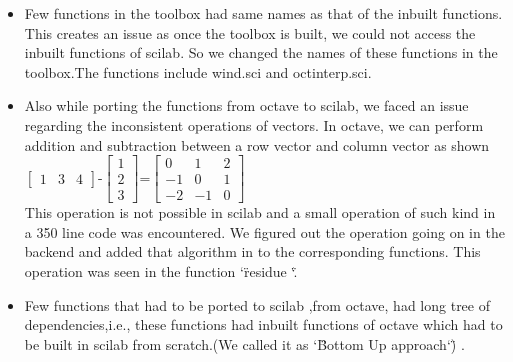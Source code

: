 \documentclass[12pt,a4paper]{report}
\begin{document}
\begin{itemize}
\item Few functions in the toolbox had same names as that of the inbuilt functions. This creates an issue as once the toolbox is built, we could not access the inbuilt functions of scilab. So we changed the names of these functions in the toolbox.The functions include wind.sci and oct\textunderscore interp.sci.


\newpage

\item Also while porting the functions from octave to scilab, we faced an issue regarding the inconsistent operations of vectors. In octave, we can perform addition and subtraction between a row vector and column vector as shown\\


$\begin{bmatrix}
 1&3&4
\end{bmatrix}$-$\begin{bmatrix}
1\\
2\\
3
\end{bmatrix}$=$\begin{bmatrix}
0 & 1 &2 \\
-1 &0  &1 \\
 -2& -1 &0
\end{bmatrix}$ \\

This operation is not possible in scilab and a small operation of such kind in a 350 line code was encountered. We figured out the operation going on in the backend and added that algorithm in to the  corresponding functions. This operation was seen in the function \char`\"residue \char`\".

\item Few functions that had to be ported to scilab ,from octave, had long tree of dependencies,i.e., these functions had inbuilt functions of octave which had to be built in scilab from scratch.(We called it as \char`\"Bottom Up approach\char`\") .




\end{itemize}


\end{document}
